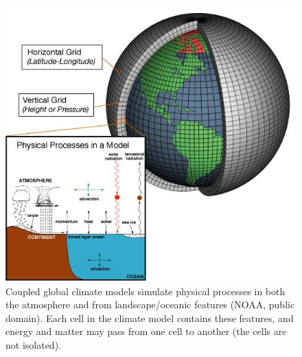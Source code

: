 \documentclass[11pt,]{article}
\begin{document}
\begin{figure}
\includegraphics[width=1\linewidth]{../_chapter_materials/model_picture} \caption{Coupled global climate models simulate physical processes in both the atmosphere and from landscape/oceanic features (NOAA, public domain). Each cell in the climate model contains these features, and energy and matter may pass from one cell to another (the cells are not isolated).}\label{fig:model-fig}
\end{figure}
\end{document}
